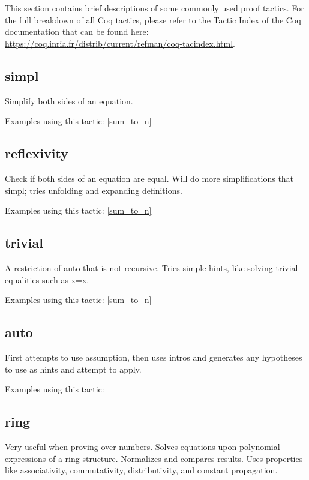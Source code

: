 
This section contains brief descriptions of some commonly used proof tactics.
For the full breakdown of all Coq tactics, please refer to the Tactic Index of the Coq documentation that can be found here:
\url{https://coq.inria.fr/distrib/current/refman/coq-tacindex.html}.


\subsection{simpl} \label{simpl}
Simplify both sides of an equation.

\noindent
Examples using this tactic: 
\ref{sum_to_n}




\subsection{reflexivity} \label{reflexivity}
Check if both sides of an equation are equal. 
Will do more simplifications that simpl; tries unfolding and expanding definitions.

\noindent
Examples using this tactic: 
\ref{sum_to_n}




\subsection{trivial} \label{trivial}
A restriction of auto that is not recursive. 
Tries simple hints, like solving trivial equalities such as x=x.

\noindent
Examples using this tactic: 
\ref{sum_to_n}



\subsection{auto} \label{auto}
First attempts to use assumption, then uses intros and generates any hypotheses to use as hints and attempt to apply.

\noindent
Examples using this tactic: 



\subsection{ring} \label{ring}
Very useful when proving over numbers.
Solves equations upon polynomial expressions of a ring structure. 
Normalizes and compares results.
Uses properties like associativity, commutativity, distributivity, and constant propagation.


